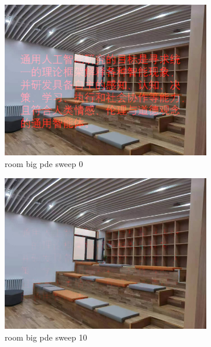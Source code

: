 \documentclass[11pt]{article}
\begin{document}
\begin{figure}[ht!]
    \centering
    \hfill%
    \begin{subfigure}[]{0.333\linewidth}
        \centering
        \includegraphics[width=\linewidth]{fig/restoration/room_big/pde_0.jpg}
        \caption{room big pde sweep 0}
    \end{subfigure}%
    \hfill%
    \begin{subfigure}[]{0.333\linewidth}
        \centering
        \includegraphics[width=\linewidth]{fig/restoration/room_big/pde_10.jpg}
        \caption{room big pde sweep 10}
    \end{subfigure}%
    \hfill%
    \begin{subfigure}[]{0.333\linewidth}

\end{subfigure}
\end{figure}
\end{document}
